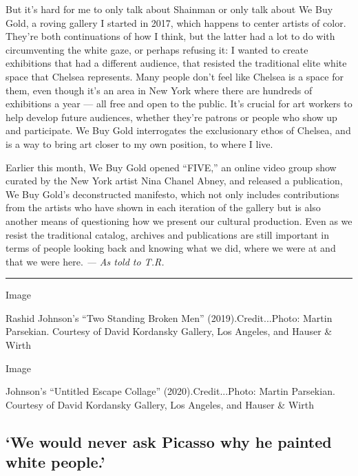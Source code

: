 But it's hard for me to only talk about Shainman or only talk about We
Buy Gold, a roving gallery I started in 2017, which happens to center
artists of color. They're both continuations of how I think, but the
latter had a lot to do with circumventing the white gaze, or perhaps
refusing it: I wanted to create exhibitions that had a different
audience, that resisted the traditional elite white space that Chelsea
represents. Many people don't feel like Chelsea is a space for them,
even though it's an area in New York where there are hundreds of
exhibitions a year --- all free and open to the public. It's crucial for
art workers to help develop future audiences, whether they're patrons or
people who show up and participate. We Buy Gold interrogates the
exclusionary ethos of Chelsea, and is a way to bring art closer to my
own position, to where I live.

Earlier this month, We Buy Gold opened ``FIVE,'' an online video group
show curated by the New York artist Nina Chanel Abney, and released a
publication, We Buy Gold's deconstructed manifesto, which not only
includes contributions from the artists who have shown in each iteration
of the gallery but is also another means of questioning how we present
our cultural production. Even as we resist the traditional catalog,
archives and publications are still important in terms of people looking
back and knowing what we did, where we were at and that we were here.
\emph{--- As told to T.R.}

\begin{center}\rule{0.5\linewidth}{\linethickness}\end{center}

Image

Rashid Johnson's ``Two Standing Broken Men'' (2019).Credit...Photo:
Martin Parsekian. Courtesy of David Kordansky Gallery, Los Angeles, and
Hauser \& Wirth

Image

Johnson's ``Untitled Escape Collage'' (2020).Credit...Photo: Martin
Parsekian. Courtesy of David Kordansky Gallery, Los Angeles, and Hauser
\& Wirth

\hypertarget{we-would-never-ask-picasso-why-he-painted-white-people}{%
\subsection{`We would never ask Picasso why he painted white
people.'}\label{we-would-never-ask-picasso-why-he-painted-white-people}}

